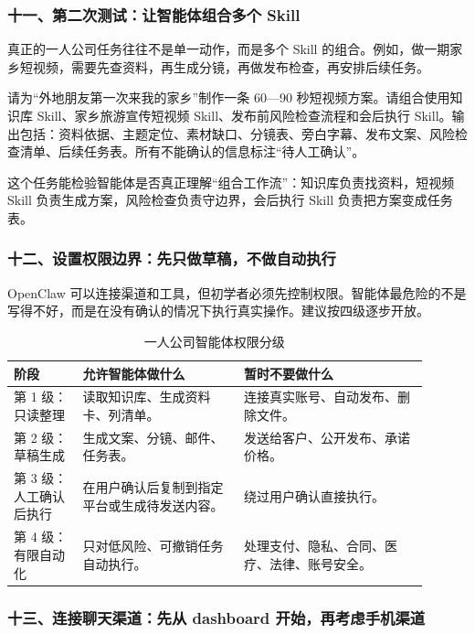 \subsubsection*{十一、第二次测试：让智能体组合多个 Skill}

真正的一人公司任务往往不是单一动作，而是多个 Skill 的组合。例如，做一期家乡短视频，需要先查资料，再生成分镜，再做发布检查，再安排后续任务。

\begin{tcolorbox}[promptbox]
请为“外地朋友第一次来我的家乡”制作一条 60—90 秒短视频方案。请组合使用知识库 Skill、家乡旅游宣传短视频 Skill、发布前风险检查流程和会后执行 Skill。输出包括：资料依据、主题定位、素材缺口、分镜表、旁白字幕、发布文案、风险检查清单、后续任务表。所有不能确认的信息标注“待人工确认”。
\end{tcolorbox}

这个任务能检验智能体是否真正理解“组合工作流”：知识库负责找资料，短视频 Skill 负责生成方案，风险检查负责守边界，会后执行 Skill 负责把方案变成任务表。

\subsubsection*{十二、设置权限边界：先只做草稿，不做自动执行}

OpenClaw 可以连接渠道和工具，但初学者必须先控制权限。智能体最危险的不是写得不好，而是在没有确认的情况下执行真实操作。建议按四级逐步开放。

\begin{table}[H]
\centering
\caption{一人公司智能体权限分级}
\label{tab:agent-permission-levels}
\begin{tabular}{p{0.15\linewidth} p{0.35\linewidth} p{0.40\linewidth}}
\toprule
\textbf{阶段} & \textbf{允许智能体做什么} & \textbf{暂时不要做什么} \\
\midrule
第 1 级：只读整理 & 读取知识库、生成资料卡、列清单。 & 连接真实账号、自动发布、删除文件。 \\
第 2 级：草稿生成 & 生成文案、分镜、邮件、任务表。 & 发送给客户、公开发布、承诺价格。 \\
第 3 级：人工确认后执行 & 在用户确认后复制到指定平台或生成待发送内容。 & 绕过用户确认直接执行。 \\
第 4 级：有限自动化 & 只对低风险、可撤销任务自动执行。 & 处理支付、隐私、合同、医疗、法律、账号安全。 \\
\bottomrule
\end{tabular}
\end{table}

\subsubsection*{十三、连接聊天渠道：先从 dashboard 开始，再考虑手机渠道}

